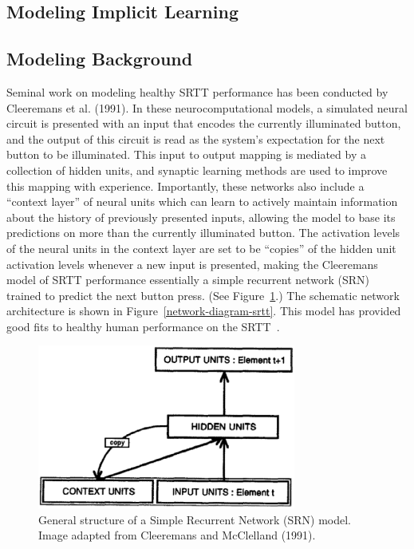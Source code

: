 \documentclass[man]{apa}
\begin{document}
\subsection{Modeling Implicit Learning}

\subsection{Modeling Background}
Seminal work on modeling healthy SRTT performance has been conducted by \nocite{Cleeremans:1991:SSRT} Cleeremans et al. (1991).  In these neurocomputational models, a simulated neural circuit is presented with an input that encodes the currently illuminated button, and the output of this circuit is read as the system's expectation for the next button to be illuminated.  This input to output mapping is mediated by a collection of hidden units, and synaptic learning methods are used to improve this mapping with experience.  Importantly, these networks also include a ``context layer'' of neural units which can learn to actively maintain information about the history of previously presented inputs, allowing the model to base its predictions on more than the currently illuminated button.  The activation levels of the neural units in the context layer are set to be ``copies'' of the hidden unit activation levels whenever a new input is presented, making the Cleeremans model of SRTT performance essentially a simple recurrent network (SRN)~\cite{ElmanJ:1990:SRN} trained to predict the next button press. (See Figure~\ref{SRN-Model}.) The schematic network architecture is shown in Figure~\ref{network-diagram-srtt}.  This model has provided good fits to healthy human performance on the SRTT~\cite{Cleeremans:1991:SSRT}. 

\begin{figure}[t]
\begin{center}
	\includegraphics[width=85mm]{figures/srn.eps}
\end{center}
\caption{General structure of a Simple Recurrent Network (SRN) model.  Image adapted from Cleeremans and McClelland (1991).}
\label{SRN-Model}
\end{figure} 
\end{document}
